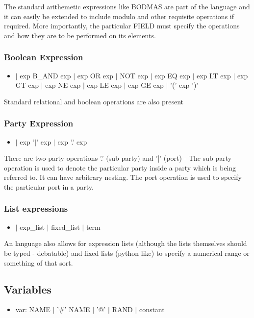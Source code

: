 \documentclass{article}
\begin{document}
The standard arithemetic expressions like BODMAS are part of the language and it can easily be extended to include modulo and other requisite operations if required. More importantly, the particular FIELD must specify the operations and how they are to be performed on its elements.

\subsubsection{Boolean Expression}
\begin{itemize}
\item $|$ exp B\_AND exp $|$ exp OR exp $|$ NOT exp $|$ exp EQ exp $|$ exp LT exp $|$ exp GT exp $|$ exp NE exp $|$ exp LE exp $|$ exp GE exp $|$ '(' exp ')' 

\end{itemize}

Standard relational and boolean operations are also present

\subsubsection{Party Expression}
\begin{itemize}
\item $|$ exp '$|$' exp $|$ exp '.' exp
\end{itemize}
There are two party operations '.' (sub-party) and '|' (port) - The sub-party operation is used to denote the particular party inside a party which is being referred to. It can have arbitrary nesting. The port operation is used to specify the particular port in a party.

\subsubsection{List expressions}
\begin{itemize}
\item $|$ exp\_list $|$ fixed\_list $|$ term
\end{itemize}
An language also allows for expression lists (although the lists themselves should be typed - debatable) and fixed lists (python like) to specify a numerical range or something of that sort.

\subsection{Variables}
\begin{itemize}
\item var: NAME $|$ '\#' NAME $|$ '@' $|$ RAND $|$ constant
\end{itemize}
\end{document}
